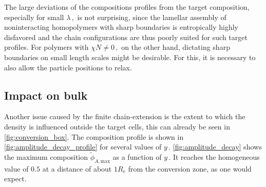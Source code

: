 \documentclass[bachelor,       %
               oneside,        %
               BCOR10mm,       %
               ngerman, english %
               ]{GAUBM}
\begin{document}
The large deviations of the compositions profiles from the target composition, especially for small $\lambda\,,$ is not surprising, since the lamellar assembly of noninteracting homopolymers with sharp boundaries is entropically highly disfavored and the chain configurations are thus poorly suited for such target profiles. For polymers with $\chi N\neq 0\,,$ on the other hand, dictating sharp boundaries on small length scales might be desirable. For this, it is necessary to also allow the particle positions to relax.

\subsection{Impact on bulk}

Another issue caused by the finite chain-extension is the extent to which the density is influenced outside the target cells, this can already be seen in \autoref{fig:conversion_box}. The composition profile is shown in \autoref{fig:amplitude_decay_profile} for several values of $y\,.$ \autoref{fig:amplitude_decay} shows the maximum composition $\tilde\phi_{A,\mathrm{max}}$ as a function of $y\,.$ It reaches the homogeneous value of $0.5$ at a distance of about $1R_e$ from the conversion zone, as one would expect. 
\end{document}
